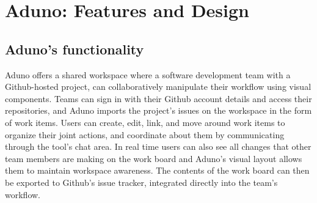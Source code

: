 \documentclass[conference]{IEEEtran}
\begin{document}
\section{Aduno: Features and Design}
\label{sec:concept}



\subsection{Aduno's functionality}
Aduno offers a shared workspace where a software development team with a Github-hosted project, can collaboratively manipulate their workflow using visual components. Teams can sign in with their Github account details and access their repositories, and Aduno imports the project's issues on the workspace in the form of work items. Users can create, edit, link, and move around work items to organize their joint actions, and coordinate about them by communicating through the tool's chat area. In real time users can also see all changes that other team members are making on the work board and Aduno's visual layout allows them to maintain workspace awareness. The contents of the work board can then be exported to Github's issue tracker, integrated directly into the team's workflow.
\end{document}
